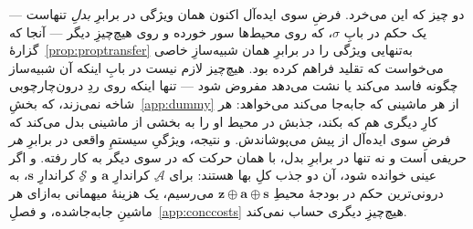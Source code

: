 \documentclass[10pt,oneside,openany]{book}
\newcommand{\Adv}{\mathcal{A}}
\newcommand{\Sim}{\mathcal{S}}
\newcommand{\bd}[1]{\mathbf{#1}}
\theoremstyle{accentdef}
\theoremstyle{accentplain}
\begin{document}
دو چیز که این می‌خرد. فرضِ سوی ایده‌آل اکنون همان ویژگی در برابرِ
\emph{بدلِ} تنهاست --- یک حکم در بابِ $\sigma$، که روی محیط‌ها سور خورده و
روی هیچ‌چیزِ دیگر --- آنجا که گزارهٔ~\ref{prop:proptransfer} به‌تنهایی
ویژگی را در برابرِ همان شبیه‌سازِ خاصی می‌خواست که تقلید فراهم کرده بود.
هیچ‌چیز لازم نیست در بابِ اینکه آن شبیه‌ساز چگونه فاسد می‌کند یا نشت
می‌دهد مفروض شود --- تنها اینکه روی ردِ درون‌چارچوبی شاخه نمی‌زند، که
بخشِ~\ref{app:dummy} از هر ماشینی که جابه‌جا می‌کند می‌خواهد: هر کارِ
دیگری هم که بکند، جذبش در محیط او را به بخشی از ماشینی بدل می‌کند که فرضِ
سوی ایده‌آل از پیش می‌پوشاندش. و نتیجه، ویژگیِ سیستمِ واقعی در برابرِ
\emph{هر} حریفی است و نه تنها در برابرِ بدل، با همان حرکت که در سوی دیگر
به کار رفته. و اگر عینی خوانده شود، آن دو جذب کلِ بها هستند: برای $\Adv$ِ
کراندارِ $\bd{a}$ و $\Sim$ِ کراندارِ $\bd{s}$، به درونی‌ترین حکم در بودجهٔ
محیطِ $\bd{z} \oplus \bd{a} \oplus \bd{s}$ می‌رسیم، یک هزینهٔ میهمانی
به‌ازای هر ماشینِ جابه‌جا‌شده، و فصلِ~\ref{app:conccosts} هیچ‌چیزِ دیگری
حساب نمی‌کند.
\end{document}
